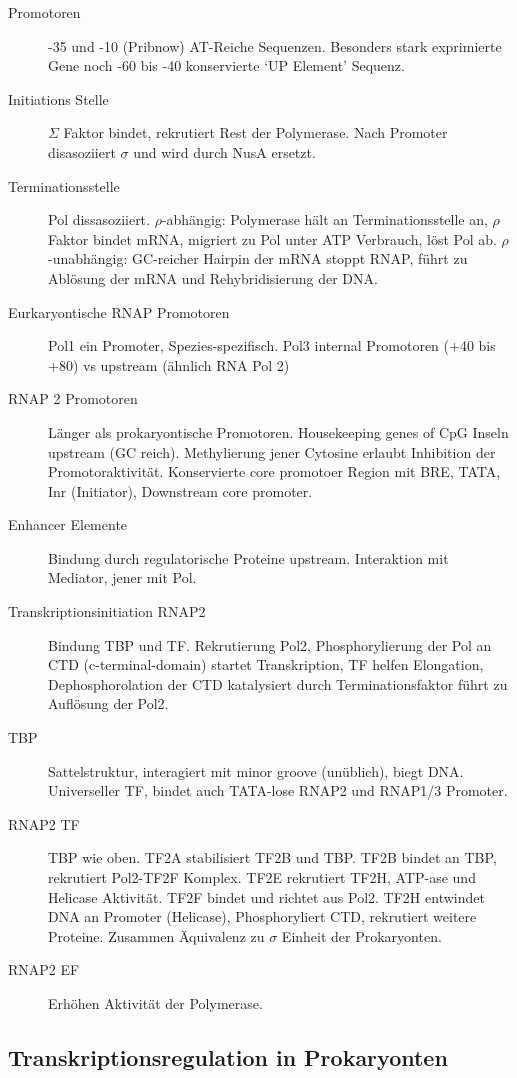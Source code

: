 \documentclass[a4paper,twocolumn,usegeometry,english,fontsize=5,DIV=28]{scrartcl}
\begin{document}
\begin{description}
	\item[Promotoren] -35 und -10 (Pribnow) AT-Reiche Sequenzen. Besonders
		stark exprimierte Gene noch -60 bis -40 konservierte `UP
		Element' Sequenz.
	\item[Initiations Stelle] $\Sigma$ Faktor bindet, rekrutiert Rest der
		Polymerase. Nach Promoter disasoziiert $\sigma$ und wird durch
		NusA ersetzt.
	\item[Terminationsstelle] Pol dissasoziiert. $\rho$-abhängig:
		Polymerase hält an Terminationsstelle an, $\rho$ Faktor bindet
		mRNA, migriert zu Pol unter ATP Verbrauch, löst Pol ab.
		$\rho$-unabhängig: GC-reicher Hairpin der mRNA stoppt RNAP,
		führt zu Ablösung der mRNA und Rehybridisierung der DNA.
	\item[Eurkaryontische RNAP Promotoren] Pol1 ein Promoter,
		Spezies-spezifisch. Pol3 internal Promotoren (+40 bis +80) vs
		upstream (ähnlich RNA Pol 2)
	\item[RNAP 2 Promotoren] Länger als prokaryontische Promotoren.
		Housekeeping genes of CpG Inseln upstream (GC reich).
		Methylierung jener Cytosine erlaubt Inhibition der
		Promotoraktivität. Konservierte core promotoer Region mit  BRE,
		TATA, Inr (Initiator), Downstream core promoter.
	\item[Enhancer Elemente] Bindung durch regulatorische Proteine
		upstream. Interaktion mit Mediator, jener mit Pol.
	\item[Transkriptionsinitiation RNAP2] Bindung TBP und TF. Rekrutierung
		Pol2, Phosphorylierung der Pol an CTD (c-terminal-domain)
		startet Transkription, TF helfen Elongation, Dephosphorolation
		der CTD katalysiert durch Terminationsfaktor führt zu Auflösung
		der Pol2.
	\item[TBP] Sattelstruktur, interagiert mit minor groove (unüblich),
		biegt DNA. Universeller TF, bindet auch TATA-lose RNAP2 und
		RNAP1/3 Promoter.
	\item[RNAP2 TF] TBP wie oben. TF2A stabilisiert TF2B und TBP. TF2B
		bindet an TBP, rekrutiert Pol2-TF2F Komplex. TF2E rekrutiert
		TF2H, ATP-ase und Helicase Aktivität. TF2F bindet und richtet
		aus Pol2. TF2H entwindet DNA an Promoter (Helicase),
		Phosphoryliert CTD, rekrutiert weitere Proteine. Zusammen
		Äquivalenz zu $\sigma$ Einheit der Prokaryonten.
	\item[RNAP2 EF] Erhöhen Aktivität der Polymerase.
\end{description}

\subsection{Transkriptionsregulation in Prokaryonten}
\end{document}
